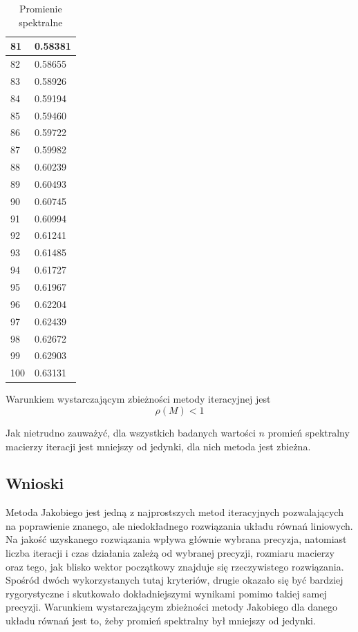 \documentclass{article}
\begin{document}
\begin{table}[H]
\begin{tabular}{|l|l|}
81 & 0.58381 \\ \hline
82 & 0.58655 \\ \hline
83 & 0.58926 \\ \hline
84 & 0.59194 \\ \hline
85 & 0.59460 \\ \hline
86 & 0.59722 \\ \hline
87 & 0.59982 \\ \hline
88 & 0.60239 \\ \hline
89 & 0.60493 \\ \hline
90 & 0.60745 \\ \hline
91 & 0.60994 \\ \hline
92 & 0.61241 \\ \hline
93 & 0.61485 \\ \hline
94 & 0.61727 \\ \hline
95 & 0.61967 \\ \hline
96 & 0.62204 \\ \hline
97 & 0.62439 \\ \hline
98 & 0.62672 \\ \hline
99 & 0.62903 \\ \hline
100 & 0.63131 \\ \hline
\end{tabular}
\caption{Promienie spektralne}
\end{table}

Warunkiem wystarczającym zbieżności metody iteracyjnej jest
$$\rho(M)<1$$

Jak nietrudno zauważyć, dla wszystkich badanych wartości $n$ promień spektralny macierzy iteracji jest mniejszy
od jedynki, dla nich metoda jest zbieżna.

\subsection{Wnioski}
Metoda Jakobiego jest jedną z najprostszych metod iteracyjnych pozwalających na poprawienie znanego, ale niedokładnego rozwiązania
układu równań liniowych. Na jakość uzyskanego rozwiązania wpływa głównie wybrana precyzja, natomiast liczba iteracji
i czas działania zależą od wybranej precyzji, rozmiaru macierzy oraz tego, jak blisko wektor początkowy znajduje się rzeczywistego 
rozwiązania. Spośród dwóch wykorzystanych tutaj kryteriów, drugie okazało się być bardziej rygorystyczne i skutkowało
dokładniejszymi wynikami pomimo takiej samej precyzji.
Warunkiem wystarczającym zbieżności metody Jakobiego dla danego układu równań jest to, żeby promień 
spektralny był mniejszy od jedynki.
\end{document}
